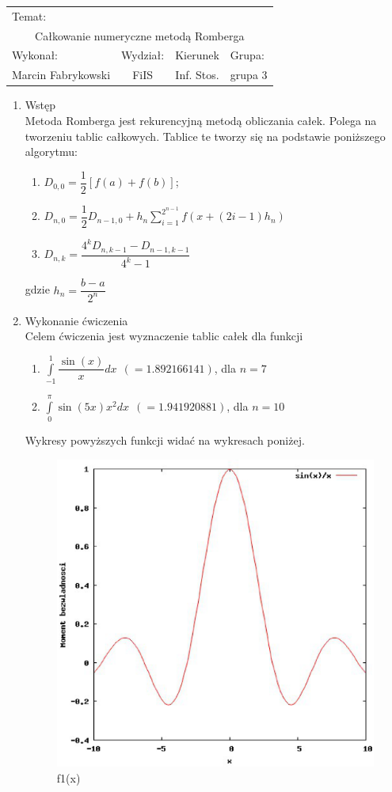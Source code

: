 \documentclass[12pt,a4paper]{article}
\begin{document}
 
\large
\begin{tabular}{|c|c|c|c|}
\hline
\multicolumn{4}{|l|}{Temat:}\\
\multicolumn{4}{|c|}{Całkowanie numeryczne metodą Romberga}\\
\hline
\multicolumn{1}{|l}{Wykonał:}&\multicolumn{1}{|l}{Wydział:}&\multicolumn{1}{|c}{Kierunek}&\multicolumn{1}{|l|}{Grupa:}\\
Marcin Fabrykowski&FiIS&Inf. Stos.&grupa 3\\
\hline
\end{tabular}
\normalsize
\vspace{2cm}
\begin{enumerate}
\item Wstęp\\
Metoda Romberga jest rekurencyjną metodą obliczania całek. Polega na tworzeniu tablic całkowych. Tablice te tworzy się na podstawie poniższego algorytmu:
\begin{enumerate}
\item $D_{0,0}=\dfrac{1}{2}\left[f(a)+f(b)\right]$;
\item $D_{n,0}=\dfrac{1}{2}D_{n-1,0}+h_n\sum\limits_{i=1}^{2^{n-1}}f(x+(2i-1)h_n)$
\item $D_{n,k}=\dfrac{4^kD_{n,k-1}-D_{n-1,k-1}}{4^k-1}$
\end{enumerate}
gdzie $h_n=\dfrac{b-a}{2^n}$
\item Wykonanie ćwiczenia\\
Celem ćwiczenia jest wyznaczenie tablic całek dla funkcji
\begin{enumerate}
\item $\int\limits_{-1}^1\dfrac{\sin(x)}{x}dx\ \ ( = 1.892166141)$, dla $n=7$
\item $\int\limits_{0}^\pi\sin(5x)x^2dx\ \ ( = 1.941920881)$, dla $n=10$
\end{enumerate}
Wykresy powyższych funkcji widać na wykresach poniżej.
\begin{figure}
\caption{f1(x)}
\includegraphics[scale=0.5]{f1.eps}

\end{figure}
\end{enumerate}
\end{document}
